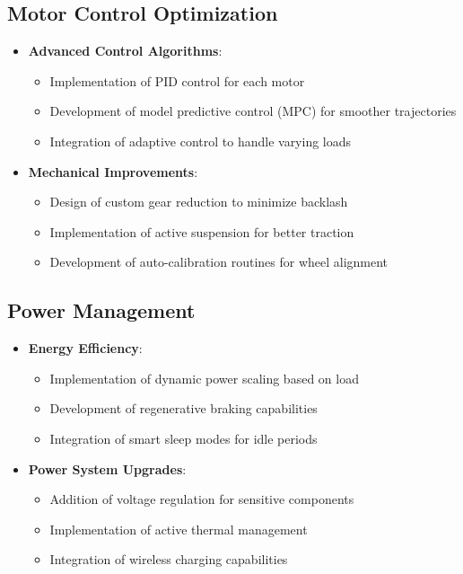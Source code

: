 \documentclass{article}
\begin{document}
\subsection{Motor Control Optimization}
\begin{itemize}
    \item \textbf{Advanced Control Algorithms}:
        \begin{itemize}
            \item Implementation of PID control for each motor
            \item Development of model predictive control (MPC) for smoother trajectories
            \item Integration of adaptive control to handle varying loads
        \end{itemize}
    
    \item \textbf{Mechanical Improvements}:
        \begin{itemize}
            \item Design of custom gear reduction to minimize backlash
            \item Implementation of active suspension for better traction
            \item Development of auto-calibration routines for wheel alignment
        \end{itemize}
\end{itemize}

\subsection{Power Management}
\begin{itemize}
    \item \textbf{Energy Efficiency}:
        \begin{itemize}
            \item Implementation of dynamic power scaling based on load
            \item Development of regenerative braking capabilities
            \item Integration of smart sleep modes for idle periods
        \end{itemize}
    
    \item \textbf{Power System Upgrades}:
        \begin{itemize}
            \item Addition of voltage regulation for sensitive components
            \item Implementation of active thermal management
            \item Integration of wireless charging capabilities
        \end{itemize}
\end{itemize}
\end{document}
